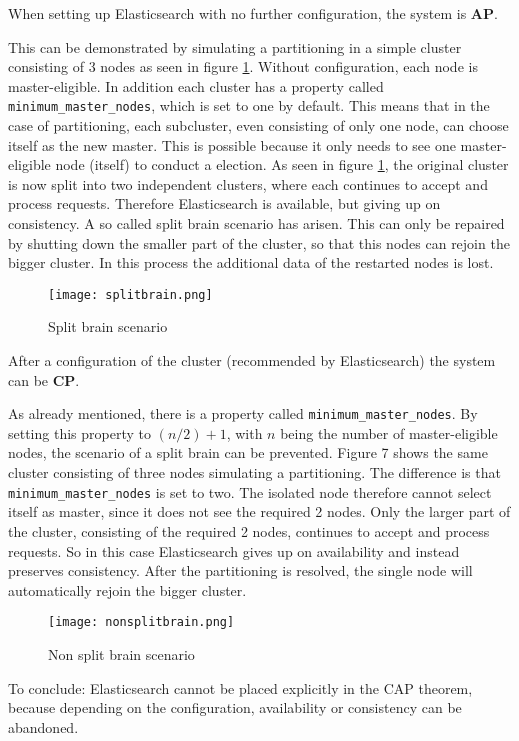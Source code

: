 When setting up Elasticsearch with no further configuration, the system is \textbf{AP}. 

This can be demonstrated by simulating a partitioning in a simple cluster consisting of 3 nodes as seen in figure \ref{fig:splitbrain}. Without configuration, each node is master-eligible. In addition each cluster has a property called \texttt{minimum\_master\_nodes}, which is set to one by default. This means that in the case of partitioning, each subcluster, even consisting of only one node, can choose itself as the new master. This is possible because it only needs to see one master-eligible node (itself) to conduct a election. As seen in figure \ref{fig:splitbrain}, the original cluster is now split into two independent clusters, where each continues to accept and process requests. Therefore Elasticsearch is available, but giving up on consistency. A so called split brain scenario has arisen. This can only be repaired by shutting down the smaller part of the cluster, so that this nodes can rejoin the bigger cluster. In this process the additional data of the restarted nodes is lost.

\begin{figure}[H]
    \centering
    \texttt{[image: splitbrain.png]}
    \caption{Split brain scenario \autocite{nathanir2019}}
    \label{fig:splitbrain}
\end{figure}

After a configuration of the cluster (recommended by Elasticsearch) the system can be \textbf{CP}.

As already mentioned, there is a property called \texttt{minimum\_master\_nodes}. By setting this property to $(n/2)+1$, with $n$ being the number of master-eligible nodes, the scenario of a split brain can be prevented. Figure 7 shows the same cluster consisting of three nodes simulating a partitioning. The difference is that \texttt{minimum\_master\_nodes} is set to two. The isolated node therefore cannot select itself as master, since it does not see the required 2 nodes. Only the larger part of the cluster, consisting of the required 2 nodes, continues to accept and process requests. So in this case Elasticsearch gives up on availability and instead preserves consistency. After the partitioning is resolved, the single node will automatically rejoin the bigger cluster.

\begin{figure}[H]
    \centering
    \texttt{[image: nonsplitbrain.png]}
    \caption{Non split brain scenario \autocite{nathanir2019}}
    \label{fig:nonsplitbrain}
\end{figure}

To conclude: Elasticsearch cannot be placed explicitly in the CAP theorem, because depending on the configuration, availability or consistency can be abandoned.
